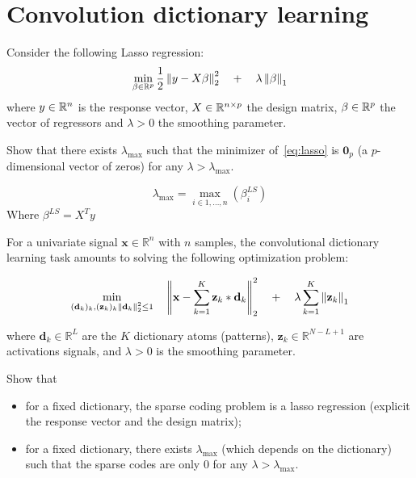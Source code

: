 \documentclass[11pt]{article}
\begin{document}
\section{Convolution dictionary learning}

\begin{exercise}
Consider the following Lasso regression:
\begin{equation}\label{eq:lasso}
    \min_{\beta\in\mathbb{R}^p} \frac{1}{2}\left\lVert y-X\beta\right\rVert^2_2 \quad + \quad \lambda \left\lVert\beta\right\rVert_1
\end{equation}
where $y\in\mathbb{R}^n$ is the response vector, $X\in\mathbb{R}^{n\times p}$ the design matrix, $\beta\in\mathbb{R}^p$ the vector of regressors and $\lambda>0$ the smoothing parameter.

Show that there exists $\lambda_{\max}$ such that the minimizer of~\eqref{eq:lasso} is $\mathbf{0}_p$ (a $p$-dimensional vector of zeros) for any $\lambda > \lambda_{\max}$. 
\end{exercise}

\begin{solution}  %

\begin{equation}
    \lambda_{\max} = \max_{i\in{1,\dots,n}}(\beta_{i}^{LS}) 
\end{equation}
    Where $\beta^{LS} = X^Ty$
\end{solution}

\begin{exercise}
For a univariate signal $\mathbf{x}\in\mathbb{R}^n$ with $n$ samples, the convolutional dictionary learning task amounts to solving the following optimization problem:

\begin{equation}
\min_{(\mathbf{d}_k)_k, (\mathbf{z}_k)_k \\ \left\lVert\mathbf{d}_k\right\rVert_2^2\leq 1} \quad\left\lVert\mathbf{x} - \sum_{k=1}^K \mathbf{z}_k * \mathbf{d}_k \right\rVert^2_2 \quad + \quad\lambda \sum_{k=1}^K \left\lVert\mathbf{z}_k\right\rVert_1
\end{equation}

where $\mathbf{d}_k\in\mathbb{R}^L$ are the $K$ dictionary atoms (patterns), $\mathbf{z}_k\in\mathbb{R}^{N-L+1}$ are activations signals, and $\lambda>0$ is the smoothing parameter.

Show that
\begin{itemize}
    \item for a fixed dictionary, the sparse coding problem is a lasso regression (explicit the response vector and the design matrix);
    \item for a fixed dictionary, there exists $\lambda_{\max}$ (which depends on the dictionary) such that the sparse codes are only 0 for any $\lambda > \lambda_{\max}$. 
\end{itemize}
\end{exercise}
\end{document}
